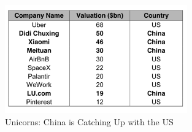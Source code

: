 \documentclass[10pt]{article}
\begin{document}
\begin{figure}[h]
\centerline{\includegraphics[width = 0.7\textwidth]{screenshot//4_2.png}}
\caption{Unicorns: China is Catching Up with the US}
\label{fig_4_2}
\end{figure}
%
%
%
%
%
\end{document}
